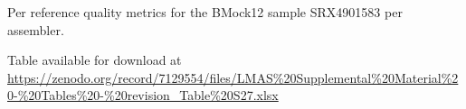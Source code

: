 \begin{table}[]
\centering
\caption{ Per reference quality metrics  for the BMock12 sample SRX4901583 per assembler.}
\label{tab:ch5_suptable27}
Table available for download at \url{https://zenodo.org/record/7129554/files/LMAS\%20Supplemental\%20Material\%20-\%20Tables\%20-\%20revision_Table\%20S27.xlsx}
\end{table}